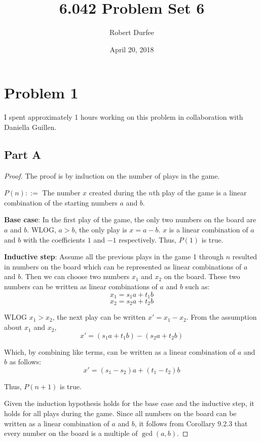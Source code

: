 \documentclass{article}
\title{ 6.042 Problem Set 6 }
\author{ Robert Durfee }
\date{ April 20, 2018 }
\begin{document}
\maketitle

\section*{Problem 1}

I spent approximately 1 hours working on this problem in collaboration with
Daniella Guillen.

\subsection*{Part A}

\begin{proof}
  The proof is by induction on the number of plays in the game.
  \begin{center}
    $P(n) ::=$ The number $x$ created during the $n$th play of the game is a
    linear combination of the starting numbers $a$ and $b$.
  \end{center}

  \noindent\textbf{Base case}: In the first play of the game, the only two
  numbers on the board are $a$ and $b$. WLOG, $a > b$, the only play is $x = a -
  b$.  $x$ is a linear combination of $a$ and $b$ with the coefficients $1$ and
  $-1$ respectively. Thus, $P(1)$ is true.

  \bigbreak

  \noindent\textbf{Inductive step}: Assume all the previous plays in the game 1
  through $n$ resulted in numbers on the board which can be represented as
  linear combinations of $a$ and $b$. Then we can choose two numbers $x_1$ and
  $x_2$ on the board. These two numbers can be written as linear combinations of
  $a$ and $b$ such as:
  $$ x_1 = s_1 a + t_1 b $$
  $$ x_2 = s_2 a + t_2 b $$
  
  WLOG $x_1 > x_2$, the next play can be written $x' = x_1 - x_2$. From the
  assumption about $x_1$ and $x_2$,
  $$ x' = \left(s_1 a + t_1 b\right) - \left(s_2 a + t_2 b\right) $$

  Which, by combining like terms, can be written as a linear combination of $a$
  and $b$ as follows:
  $$ x' = \left(s_1 - s_2\right)a + \left(t_1 - t_2\right)b $$

  Thus, $P(n + 1)$ is true.

  \bigbreak

  Given the induction hypothesis holds for the base case and the inductive step,
  it holds for all plays during the game. Since all numbers on the board can be
  written as a linear combination of $a$ and $b$, it follows from Corollary
  9.2.3 that every number on the board is a multiple of $\gcd(a, b)$.

\end{proof}
\end{document}
